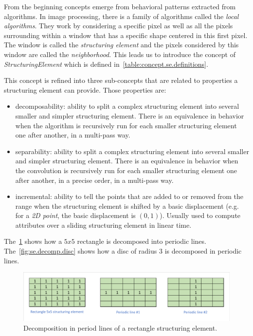 From the beginning concepts emerge from behavioral patterns extracted from algorithms. In image processing, there is a
family of algorithms called the \emph{local algorithms}. They work by considering a specific pixel as well as all the
pixels surrounding within a window that has a specific shape centered in this first pixel. The window is called the
\emph{structuring element} and the pixels considered by this window are called the \emph{neighborhood}. This leads us to
introduce the concept of \emph{StructuringElement} which is defined in~\cref{table:concept.se.definitions}.

This concept is refined into three sub-concepts that are related to properties a structuring element can provide. Those
properties are:
\begin{itemize}
  \item decomposability: ability to split a complex structuring element into several smaller and simpler structuring
        element. There is an equivalence in behavior when the algorithm is recursively run for each smaller structuring
        element one after another, in a multi-pass way.
  \item separability: ability to split a complex structuring element into several smaller and simpler structuring
        element. There is an equivalence in behavior when the convolution is recursively run for each smaller
        structuring element one after another, in a precise order, in a multi-pass way.
  \item incremental: ability to tell the points that are added to or removed from the range when the structuring element
        is shifted by a basic displacement (e.g. for a \emph{2D point}, the basic displacement is \((0,1)\)). Usually
        used to compute attributes over a sliding structuring element in linear time.
\end{itemize}

The~\cref{fig:se.decomp.rect} shows how a $5x5$ rectangle is decomposed into periodic lines.
The~\cref{fig:se.decomp.disc} shows how a disc of radius 3 is decomposed in periodic lines.

\begin{figure}[htbp]
  \centering
  \includegraphics[width=.8\linewidth]{../figures/rect_se_decomp}
  \caption{Decomposition in period lines of a rectangle structuring element.}
  \label{fig:se.decomp.rect}
\end{figure}

